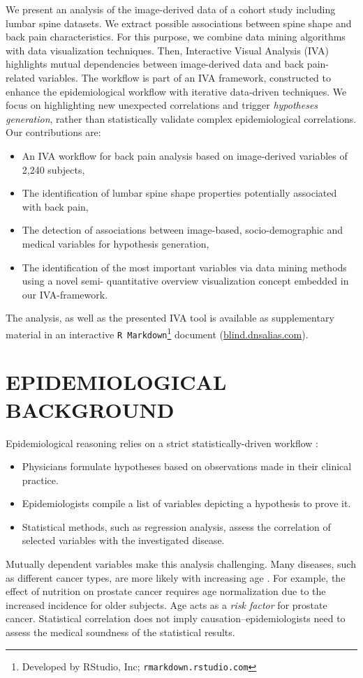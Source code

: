 \documentclass[a4paper,twoside]{style/article}
\begin{document}
We present an analysis of the image-derived data of a cohort study including lumbar spine datasets.
We extract possible associations between spine shape and back pain characteristics.
For this purpose, we combine data mining algorithms with data visualization techniques.
Then, Interactive Visual Analysis (IVA) highlights mutual dependencies between image-derived data and back pain-related variables.
The workflow is part of an IVA framework, constructed to enhance the epidemiological workflow with iterative data-driven techniques.
We focus on highlighting new unexpected correlations and trigger \emph{hypotheses generation}, rather than statistically validate complex epidemiological correlations.
Our contributions are:
\begin{itemize}
\item An IVA workflow for back pain analysis based on image-derived variables of 2,240 subjects,
\item The identification of lumbar spine shape properties potentially associated with back pain,
\item The detection of associations between image-based, socio-demographic and medical variables for hypothesis generation,
\item The identification of the most important variables via data mining methods using a novel semi- quantitative overview visualization concept embedded in our IVA-framework.
\end{itemize}
The analysis, as well as the presented IVA tool is available as supplementary material in an interactive \texttt{R Markdown}\footnote{Developed by RStudio, Inc; \texttt{rmarkdown.rstudio.com}} document (\url{blind.dnsalias.com}).
\section{\uppercase{Epidemiological Background}}
\label{sec:EpidemiologicalBackground}
\noindent Epidemiological reasoning relies on a strict statistically-driven workflow \cite{Fletcher}:
\begin{itemize}
	\item Physicians formulate hypotheses based on observations made in their clinical practice.
	\item Epidemiologists compile a list of variables depicting a hypothesis to prove it.
	\item Statistical methods, such as regression analysis, assess the correlation of selected variables with the investigated disease.
\end{itemize}
Mutually dependent variables make this analysis challenging.
Many diseases, such as different cancer types, are more likely with increasing age \cite{Fletcher}.
For example, the effect of nutrition on prostate cancer requires age normalization due to the increased incidence for older subjects.
Age acts as a \emph{risk factor} for prostate cancer.
Statistical correlation does not imply causation--epidemiologists need to assess the medical soundness of the statistical results.
\end{document}

